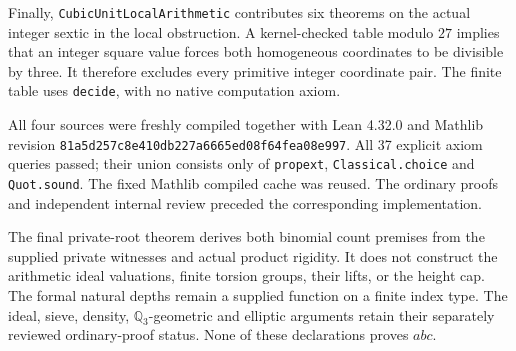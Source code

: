 Finally, \texttt{CubicUnit\allowbreak LocalArithmetic} contributes six
theorems on the actual integer sextic in the local obstruction. A
kernel-checked table modulo $27$ implies that an integer square value
forces both homogeneous coordinates to be divisible by three.
It therefore excludes every primitive integer coordinate pair.
The finite table uses \texttt{decide}, with no native computation axiom.

All four sources were freshly compiled together with Lean 4.32.0 and
Mathlib revision \texttt{81a5d257c8e410db227a6665ed08f64fea08e997}.
All 37 explicit axiom queries passed; their union consists only of
\texttt{propext}, \texttt{Classical.choice} and \texttt{Quot.sound}.
The fixed Mathlib compiled cache was reused. The ordinary proofs and
independent internal review preceded the corresponding implementation.

The final private-root theorem derives both binomial count premises
from the supplied private witnesses and actual product rigidity.
It does not construct the arithmetic ideal valuations, finite torsion
groups, their lifts, or the height cap. The formal natural depths remain
a supplied function on a finite index type. The ideal, sieve, density,
$\mathbb Q_3$-geometric and elliptic arguments retain their separately
reviewed ordinary-proof status. None of these declarations proves $abc$.
